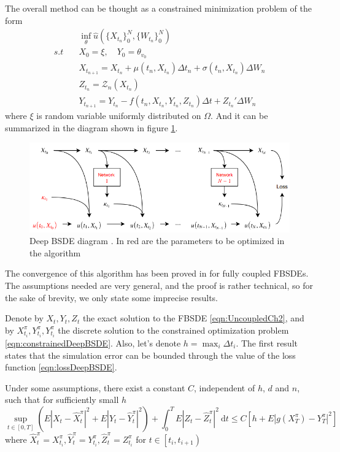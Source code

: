 The overall method can be thought as a constrained minimization problem of the form
\begin{equation}
	\label{eqn:constrainedDeepBSDE}
	\begin{split}
		&\inf_{\theta}\hat{u}(\{X_{t_n}\}_{0}^{N},\{W_{t_n}\}_{0}^{N})\\
		s.t \quad & X_0=\xi ,\quad Y_0=\theta_{v_0}\\
		& 		X_{t_{n+1}} = X_{t_n} +\mu\left(t_n, X_{t_n}\right) \Delta t_n+\sigma\left(t_n, X_{t_n}\right) \Delta W_n\\
		&Z_{t_n}=\mathcal{Z}_n(X_{t_n})\\
		&Y_{t_{n+1}}=Y_{t_n}-f(t_n,X_{t_n},Y_{t_n},Z_{t_n})\Delta t +Z_{t_n}'\Delta W_{n}
	\end{split}
\end{equation}
where $\xi$ is random variable uniformly distributed on $\Omega$. And it can be summarized in the diagram shown in figure \ref{fig:deepbsdemap}.
\begin{figure}[H]
	\centering
	\includegraphics[width=\linewidth]{images/DeepBSDEMap}
	\caption{Deep BSDE diagram \cite{chan-wai-nam_machine_2018}. In red are the parameters to be optimized in the algorithm }
	\label{fig:deepbsdemap}
\end{figure}

The convergence of this algorithm has been proved in \cite{han_convergence_2020} for fully coupled FBSDEs. The assumptions needed are very general, and the proof is rather technical, so for the sake of brevity, we only state some imprecise results.

Denote by $X_t,Y_t,Z_t$ the exact solution to the FBSDE \eqref{eqn:UncoupledCh2}, and by $X_{t_i}^\pi,Y_{t_i}^\pi,Y_{t_i}^\pi$ the discrete solution to the constrained optimization problem \eqref{eqn:constrainedDeepBSDE}. Also, let's denote $h=\max_{i}\Delta t_i$. The first result states that the simulation error can be bounded through the value of the loss function \eqref{eqn:lossDeepBSDE}.
\begin{theorem}
	Under some assumptions, there exist a constant $C$, independent of $h$, $d$ and $n$, such that for sufficiently small $h$
	$$
	\sup _{t \in[0, T]}\left(E\left|X_t-\hat{X}_t^\pi\right|^2+E\left|Y_t-\hat{Y}_t^\pi\right|^2\right)+\int_0^T E\left|Z_t-\hat{Z}_t^\pi\right|^2 \mathrm{~d} t \leq C\left[h+E\left|g\left(X_T^\pi\right)-Y_T^\pi\right|^2\right]
	$$
	where $\hat{X}_t^\pi=X_{t_i}^\pi, \hat{Y}_t^\pi=Y_{t_i}^\pi, \hat{Z}_t^\pi=Z_{t_i}^\pi$ for $t \in\left[t_i, t_{i+1}\right)$
\end{theorem}   

